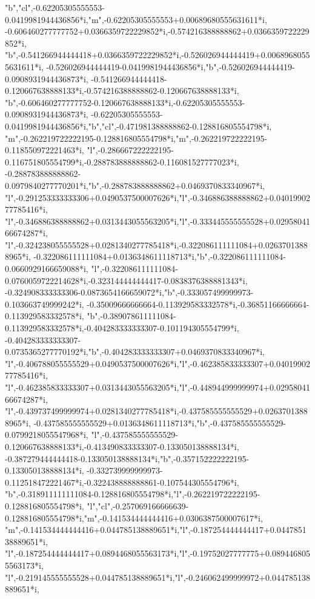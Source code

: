 \documentclass[border=5pt]{standalone}%
\begin{document}
\begin{luacode*}
{"b","cl",-0.62205305555553-0.0419981944436856*i,"m",-0.62205305555553+0.00689680555631611*i,
-0.606460277777752+0.0366359722229852*i,-0.574216388888862+0.0366359722229852*i,
"b",-0.541266944444418+0.0366359722229852*i,-0.526026944444419+0.00689680555631611*i,
-0.526026944444419-0.0419981944436856*i,"b",-0.526026944444419-0.0908931944436873*i,
-0.541266944444418-0.120667638888133*i,-0.574216388888862-0.120667638888133*i,
"b",-0.606460277777752-0.120667638888133*i,-0.62205305555553-0.0908931944436873*i,
-0.62205305555553-0.0419981944436856*i,"b","cl",-0.471981388888862-0.128816805554798*i,
"m",-0.262219722222195-0.128816805554798*i,"m",-0.262219722222195-0.118550972221463*i,
"l",-0.286667222222195-0.116751805554799*i,-0.288783888888862-0.116081527777023*i,
-0.288783888888862-0.0979840277770201*i,"b",-0.288783888888862+0.0469370833340967*i,
"l",-0.291253333333306+0.0490537500007626*i,"l",-0.346886388888862+0.0401990277785416*i,
"l",-0.346886388888862+0.0313443055563205*i,"l",-0.333445555555528+0.0295804166674287*i,
"l",-0.324238055555528+0.0281340277785418*i,-0.322086111111084+0.02637013888965*i,
-0.322086111111084+0.0136348611118713*i,"b",-0.322086111111084-0.0660929166659088*i,
"l",-0.322086111111084-0.0760059722214628*i,-0.323144444444417-0.0838376388881343*i,
-0.324908333333306-0.0873654166659072*i,"b",-0.333057499999973-0.103663749999242*i,
-0.35009666666664-0.113929583332578*i,-0.36851166666664-0.113929583332578*i,
"b",-0.389078611111084-0.113929583332578*i,-0.404283333333307-0.101194305554799*i,
-0.404283333333307-0.0735365277770192*i,"b",-0.404283333333307+0.0469370833340967*i,
"l",-0.406788055555529+0.0490537500007626*i,"l",-0.462385833333307+0.0401990277785416*i,
"l",-0.462385833333307+0.0313443055563205*i,"l",-0.448944999999974+0.0295804166674287*i,
"l",-0.439737499999974+0.0281340277785418*i,-0.437585555555529+0.02637013888965*i,
-0.437585555555529+0.0136348611118713*i,"b",-0.437585555555529-0.0799218055547968*i,
"l",-0.437585555555529-0.120667638888133*i,-0.413490833333307-0.133050138888134*i,
-0.387279444444418-0.133050138888134*i,"b",-0.357152222222195-0.133050138888134*i,
-0.332739999999973-0.112518472221467*i,-0.322438888888861-0.107544305554796*i,
"b",-0.318911111111084-0.128816805554798*i,"l",-0.262219722222195-0.128816805554798*i,
"l","cl",-0.257069166666639-0.128816805554798*i,"m",-0.141534444444416+0.0306387500007617*i,
"m",-0.141534444444416+0.044785138889651*i,"l",-0.187254444444417+0.044785138889651*i,
"l",-0.187254444444417+0.0894468055563173*i,"l",-0.19752027777775+0.0894468055563173*i,
"l",-0.219145555555528+0.044785138889651*i,"l",-0.246062499999972+0.044785138889651*i,
}
\end{luacode*}
\end{document}
